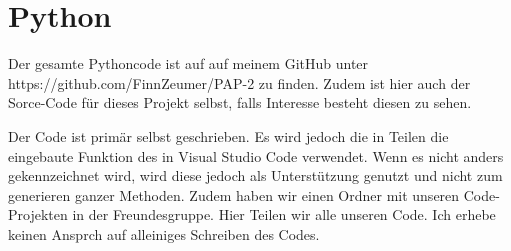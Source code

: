 \chapter{Python}
\label{ch:Python}


Der gesamte Pythoncode ist auf auf meinem GitHub unter https://github.com/FinnZeumer/PAP-2 \cite{githubPAP2} zu finden. Zudem ist hier auch der Sorce-Code für dieses Projekt selbst, falls Interesse besteht diesen zu sehen.

Der Code ist primär selbst geschrieben. Es wird jedoch die in Teilen die eingebaute Funktion des  in Visual Studio Code verwendet. Wenn es nicht anders gekennzeichnet wird, wird diese jedoch als Unterstützung genutzt und nicht zum generieren ganzer Methoden. 
Zudem haben wir einen Ordner mit unseren Code-Projekten in der Freundesgruppe. Hier Teilen wir alle unseren Code. Ich erhebe keinen Ansprch auf alleiniges Schreiben des Codes.

% 
